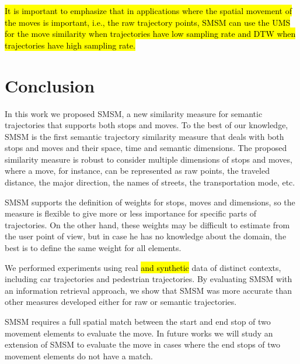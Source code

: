 \documentclass[12pt]{article}
\begin{document}
\hl{It is important to emphasize that in applications where the spatial movement of the moves is important, i.e., the raw trajectory points, SMSM can use the UMS for the move similarity when trajectories have low sampling rate and DTW when trajectories have high sampling rate.}


\section{Conclusion} \label{sec:conclusions}
In this work we proposed SMSM, a new similarity measure for semantic trajectories that supports both stops and moves.  To the best of our knowledge, SMSM is the first semantic trajectory similarity measure that deals with both stops and moves and their space, time and semantic dimensions. The proposed similarity measure is robust  to consider multiple dimensions of stops and moves, where a move, for instance, can be represented as raw points, the traveled distance, the major direction, the names of streets, the transportation mode, etc.

SMSM supports the definition of weights for stops, moves and dimensions, so the measure is flexible to give more or less importance for specific parts of trajectories. On the other hand, these weights may be difficult to estimate from the user point of view, but in case he has no knowledge about the domain, the best is to define the same weight for all elements.

We performed experiments using real \hl{and synthetic} data of distinct contexts, including car trajectories and pedestrian trajectories. By evaluating SMSM with an information retrieval approach, we show that SMSM was more accurate than other measures developed either for raw or semantic trajectories.

SMSM requires a full spatial match between the start and end stop of two movement elements to evaluate the move. In future works we will study an extension of SMSM to evaluate the move in cases where the end stops of two movement elements do not have a match.



\end{document}
